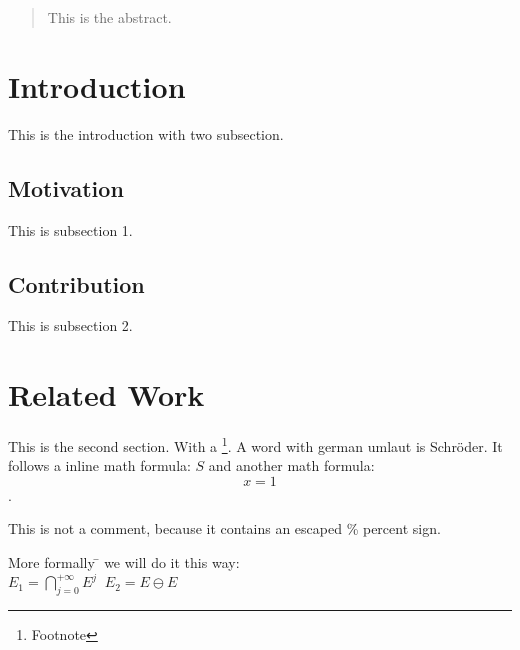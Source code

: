 


\begin{abstract}
This is the abstract.
\end{abstract}

\section{Introduction}
This is the introduction with two subsection.

\subsection{Motivation}
This is subsection 1.

\subsection{Contribution}
This is subsection 2.

\section{Related Work}
This is the second section. With a \footnote{Footnote}.
A word with german umlaut is Schr\"{o}der. It follows a inline math formula: $S$
and another math formula: $$x=1$$.

This is not a comment, because it contains an escaped \% percent sign.

\begin{tabbing}
More formally \=\+ we will do it this way:\\
$E_1=\bigcap_{j=0}^{+\infty}E^j\;\;E_2=E\ominus E$\\
\end{tabbing}

